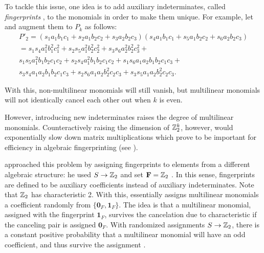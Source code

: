 To tackle this issue, one idea is to add auxiliary indeterminates, 
called \emph{fingerprints} \cite{KouWil15}, to the monomials 
in order to make them unique. For example, let
and augment them to $P_k$ as follows: 
\begin{multline*}
  P'_2 = (s_1a_1b_1c_1 + s_2a_1b_2c_2 + s_3a_2b_2c_3)(s_4a_1b_1c_1 + s_5a_1b_2c_2 + s_6a_2b_2c_3) \\
  = s_1s_4a_1^2b_1^2c_1^2 + s_2s_5a_1^2b_2^2c_2^2 + s_3s_6a_2^2b_2^2c_3^2 + \\
  s_1s_5a_1^2b_1b_2c_1c_2 + s_2s_4a_1^2b_1b_2c_1c_2 + s_1s_6a_1a_2b_1b_2c_1c_3 + \\
  s_3s_4a_1a_2b_1b_2c_1c_3 + s_2s_6a_1a_2b_2^2c_2c_3 + s_3s_5a_1a_2b_2^2c_2c_3. 
\end{multline*}

With this, non-multilinear monomials will still vanish, but multilinear monomials 
will not identically cancel each other out when $k$ is even. 

However, introducing new indeterminates raises the degree of multilinear
monomials. 
Counteractively raising the dimension of $\mathbb Z_2^k$, however, would  
exponentially slow down matrix multiplications which prove to be %
important for efficiency in algebraic fingerprinting (see ).

\citeauthor{Koutis08} approached this problem by assigning fingerprints to elements 
from a different algebraic structure: he used $S \to \mathbb Z_2$ and set 
$\mathbf{F} = \mathbb Z_2$ \cite{Koutis08}. In this sense, 
fingerprints are defined to be auxiliary coefficients instead of auxiliary indeterminates. 
Note that $\mathbb Z_2$ has characteristic 2. With this, 
\citeauthor{Koutis08} essentially assigns multilinear monomials a coefficient 
randomly from $\{\mathbf{0}_F, \mathbf{1}_F\}$. The idea is that a multilinear monomial, 
assigned with the fingerprint $\mathbf{1}_F$,  
survives the cancelation due to characteristic if the canceling pair is assigned $\mathbf{0}_F$. 
With randomized assignments $S \to \mathbb Z_2$, 
there is a constant positive probability that a multilinear 
monomial will have an odd coefficient, and thus survive the assignment \cite{Koutis08}.

